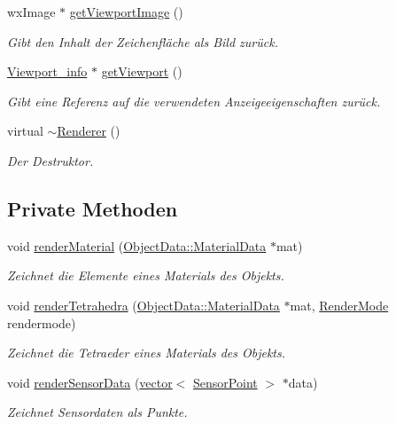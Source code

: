 \begin{DoxyCompactItemize}
wx\-Image $\ast$ \hyperlink{classRenderer_afe4e5a9e26320e0b8276b2d0f82a1827}{get\-Viewport\-Image} ()
\begin{DoxyCompactList}\small\item\em Gibt den Inhalt der Zeichenfläche als Bild zurück. \end{DoxyCompactList}\item 
\hyperlink{structRenderer_1_1Viewport__info}{Viewport\-\_\-info} $\ast$ \hyperlink{classRenderer_a5bfa9daf1a53660f1cf6c254665253e2}{get\-Viewport} ()
\begin{DoxyCompactList}\small\item\em Gibt eine Referenz auf die verwendeten Anzeigeeigenschaften zurück. \end{DoxyCompactList}\item 
virtual \hyperlink{classRenderer_afeee408862d5bd6255a6882d47e6d5cd}{$\sim$\-Renderer} ()
\begin{DoxyCompactList}\small\item\em Der Destruktor. \end{DoxyCompactList}\end{DoxyCompactItemize}
\subsection*{Private Methoden}
\begin{DoxyCompactItemize}
\item 
void \hyperlink{classRenderer_acb6c468b92221cf8a121b87a70a3da0c}{render\-Material} (\hyperlink{structObjectData_1_1MaterialData}{Object\-Data\-::\-Material\-Data} $\ast$mat)
\begin{DoxyCompactList}\small\item\em Zeichnet die Elemente eines Materials des Objekts. \end{DoxyCompactList}\item 
void \hyperlink{classRenderer_a927f376a6283de3181b86f65b927386c}{render\-Tetrahedra} (\hyperlink{structObjectData_1_1MaterialData}{Object\-Data\-::\-Material\-Data} $\ast$mat, \hyperlink{classRenderer_aa9844470f59e9fdf3aed088936100863}{Render\-Mode} rendermode)
\begin{DoxyCompactList}\small\item\em Zeichnet die Tetraeder eines Materials des Objekts. \end{DoxyCompactList}\item 
void \hyperlink{classRenderer_ad2eac0343aef1abd05ed95b1b364785f}{render\-Sensor\-Data} (\hyperlink{classstd_1_1vector}{vector}$<$ \hyperlink{structUtils_1_1SensorPoint}{Sensor\-Point} $>$ $\ast$data)
\begin{DoxyCompactList}\small\item\em Zeichnet Sensordaten als Punkte. \end{DoxyCompactList}\end{DoxyCompactItemize}
